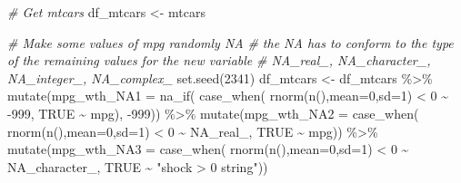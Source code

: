 \documentclass[
]{book}
\newenvironment{Shaded}{\begin{snugshade}}{\end{snugshade}}
\newcommand{\AttributeTok}[1]{\textcolor[rgb]{0.77,0.63,0.00}{#1}}
\newcommand{\CommentTok}[1]{\textcolor[rgb]{0.56,0.35,0.01}{\textit{#1}}}
\newcommand{\ConstantTok}[1]{\textcolor[rgb]{0.00,0.00,0.00}{#1}}
\newcommand{\DecValTok}[1]{\textcolor[rgb]{0.00,0.00,0.81}{#1}}
\newcommand{\FunctionTok}[1]{\textcolor[rgb]{0.00,0.00,0.00}{#1}}
\newcommand{\NormalTok}[1]{#1}
\newcommand{\OtherTok}[1]{\textcolor[rgb]{0.56,0.35,0.01}{#1}}
\newcommand{\SpecialCharTok}[1]{\textcolor[rgb]{0.00,0.00,0.00}{#1}}
\newcommand{\StringTok}[1]{\textcolor[rgb]{0.31,0.60,0.02}{#1}}
\begin{document}
\begin{Shaded}
\begin{Highlighting}[]
\CommentTok{\# Get mtcars}
\NormalTok{df\_mtcars }\OtherTok{\textless{}{-}}\NormalTok{ mtcars}

\CommentTok{\# Make some values of mpg randomly NA}
\CommentTok{\# the NA has to conform to the type of the remaining values for the new variable}
\CommentTok{\# NA\_real\_, NA\_character\_, NA\_integer\_, NA\_complex\_}
\FunctionTok{set.seed}\NormalTok{(}\DecValTok{2341}\NormalTok{)}
\NormalTok{df\_mtcars }\OtherTok{\textless{}{-}}\NormalTok{ df\_mtcars }\SpecialCharTok{\%\textgreater{}\%} 
  \FunctionTok{mutate}\NormalTok{(}\AttributeTok{mpg\_wth\_NA1 =} \FunctionTok{na\_if}\NormalTok{(}
    \FunctionTok{case\_when}\NormalTok{(}
      \FunctionTok{rnorm}\NormalTok{(}\FunctionTok{n}\NormalTok{(),}\AttributeTok{mean=}\DecValTok{0}\NormalTok{,}\AttributeTok{sd=}\DecValTok{1}\NormalTok{) }\SpecialCharTok{\textless{}} \DecValTok{0} \SpecialCharTok{\textasciitilde{}} \SpecialCharTok{{-}}\DecValTok{999}\NormalTok{, }
      \ConstantTok{TRUE} \SpecialCharTok{\textasciitilde{}}\NormalTok{ mpg), }
    \SpecialCharTok{{-}}\DecValTok{999}\NormalTok{)) }\SpecialCharTok{\%\textgreater{}\%}
  \FunctionTok{mutate}\NormalTok{(}\AttributeTok{mpg\_wth\_NA2 =} \FunctionTok{case\_when}\NormalTok{(}
    \FunctionTok{rnorm}\NormalTok{(}\FunctionTok{n}\NormalTok{(),}\AttributeTok{mean=}\DecValTok{0}\NormalTok{,}\AttributeTok{sd=}\DecValTok{1}\NormalTok{) }\SpecialCharTok{\textless{}} \DecValTok{0} \SpecialCharTok{\textasciitilde{}} \ConstantTok{NA\_real\_}\NormalTok{, }
    \ConstantTok{TRUE} \SpecialCharTok{\textasciitilde{}}\NormalTok{ mpg)) }\SpecialCharTok{\%\textgreater{}\%}
  \FunctionTok{mutate}\NormalTok{(}\AttributeTok{mpg\_wth\_NA3 =} \FunctionTok{case\_when}\NormalTok{(}
    \FunctionTok{rnorm}\NormalTok{(}\FunctionTok{n}\NormalTok{(),}\AttributeTok{mean=}\DecValTok{0}\NormalTok{,}\AttributeTok{sd=}\DecValTok{1}\NormalTok{) }\SpecialCharTok{\textless{}} \DecValTok{0} \SpecialCharTok{\textasciitilde{}} \ConstantTok{NA\_character\_}\NormalTok{, }
    \ConstantTok{TRUE} \SpecialCharTok{\textasciitilde{}} \StringTok{"shock \textgreater{} 0 string"}\NormalTok{))}
  

\end{Highlighting}
\end{Shaded}
\end{document}
